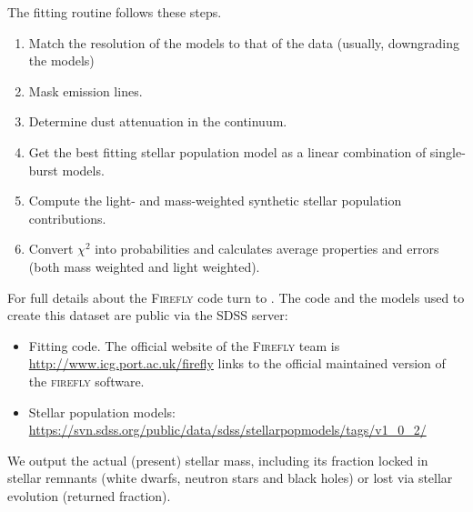 \documentclass[onecolumn]{aa}
\begin{document}
The fitting routine follows these steps.
\begin{enumerate}
\item Match the resolution of the models to that of the data (usually, downgrading the models)
\item Mask emission lines.
\item Determine dust attenuation in the continuum.
\item Get the best fitting stellar population model as a linear combination of single-burst models.
\item Compute the light- and mass-weighted synthetic stellar population contributions.
\item Convert $\chi^2$ into probabilities and calculates average properties and errors (both mass weighted and light weighted).%
\end{enumerate}
For full details about the \textsc{Firefly} code turn to \citet{firefly2017MNRAS}. 
The code and the models used to create this dataset are public via the SDSS server:
\begin{itemize}
\item Fitting code. The official website of the \textsc{Firefly} team is \url{http://www.icg.port.ac.uk/firefly} links to the official maintained version of the \textsc{firefly} software. 
\item Stellar population models: \url{https://svn.sdss.org/public/data/sdss/stellarpopmodels/tags/v1_0_2/} 
\end{itemize}
We output the actual (present) stellar mass, including its fraction locked in stellar remnants (white dwarfs, neutron stars and black holes) or lost via stellar evolution (returned fraction). 
\end{document}
